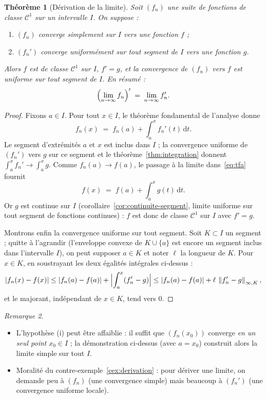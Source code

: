 \documentclass[11pt,a4paper]{article}
\theoremstyle{plain}
\newtheorem{theoreme}{Théorème}[section]
\theoremstyle{definition}
\theoremstyle{remark}
\newtheorem{remarque}[theoreme]{Remarque}
\newcommand{\Ninf}[2]{\left\lVert #1 \right\rVert_{\infty,#2}}
\newcommand{\dd}{\,\mathrm{d}}
\numberwithin{equation}{section}
\begin{document}
\begin{theoreme}[Dérivation de la limite]\label{thm:derivation}
Soit $(f_n)$ une suite de fonctions de classe $\mathcal{C}^1$ sur un
intervalle $I$. On suppose :
\begin{enumerate}[label=(\roman*)]
    \item $(f_n)$ converge simplement sur $I$ vers une fonction $f$ ;
    \item $(f_n')$ converge uniformément sur tout segment de $I$ vers une
    fonction $g$.
\end{enumerate}
Alors $f$ est de classe $\mathcal{C}^1$ sur $I$, $f'=g$, et la convergence
de $(f_n)$ vers $f$ est uniforme sur tout segment de $I$. En résumé :
\[
    \Bigl(\lim_{n\to\infty} f_n\Bigr)' \;=\; \lim_{n\to\infty} f_n' .
\]
\end{theoreme}

\begin{proof}
Fixons $a\in I$. Pour tout $x\in I$, le théorème fondamental de l'analyse
donne
\begin{equation}\label{eq:tfa}
    f_n(x) \;=\; f_n(a) + \int_a^x f_n'(t)\dd t .
\end{equation}
Le segment d'extrémités $a$ et $x$ est inclus dans $I$ ; la convergence
uniforme de $(f_n')$ vers $g$ sur ce segment et le
théorème~\ref{thm:integration} donnent
$\int_a^x f_n' \to \int_a^x g$. Comme $f_n(a)\to f(a)$, le passage à la
limite dans~\eqref{eq:tfa} fournit
\[
    f(x) \;=\; f(a) + \int_a^x g(t)\dd t .
\]
Or $g$ est continue sur $I$ (corollaire~\ref{cor:continuite-segment},
limite uniforme sur tout segment de fonctions continues) : $f$ est donc de
classe $\mathcal{C}^1$ sur $I$ avec $f'=g$.

Montrons enfin la convergence uniforme sur tout segment. Soit
$K\subset I$ un segment ; quitte à l'agrandir (l'enveloppe convexe de
$K\cup\{a\}$ est encore un segment inclus dans l'intervalle $I$), on peut
supposer $a\in K$ et noter $\ell$ la longueur de $K$. Pour $x\in K$, en
soustrayant les deux égalités intégrales ci-dessus :
\[
    \lvert f_n(x)-f(x)\rvert
    \leq \lvert f_n(a)-f(a)\rvert + \Bigl\lvert \int_a^x (f_n'-g)\Bigr\rvert
    \leq \lvert f_n(a)-f(a)\rvert + \ell\,\Ninf{f_n'-g}{K} ,
\]
et le majorant, indépendant de $x\in K$, tend vers $0$.
\end{proof}

\begin{remarque}
\begin{itemize}
    \item L'hypothèse (i) peut être affaiblie : il suffit que $(f_n(x_0))$
    converge \emph{en un seul point} $x_0\in I$ ; la démonstration
    ci-dessus (avec $a=x_0$) construit alors la limite simple sur tout $I$.
    \item Moralité du contre-exemple~\ref{cex:derivation} : pour dériver
    une limite, on demande peu à $(f_n)$ (une convergence simple) mais
    beaucoup à $(f_n')$ (une convergence uniforme locale).
\end{itemize}
\end{remarque}
\end{document}
